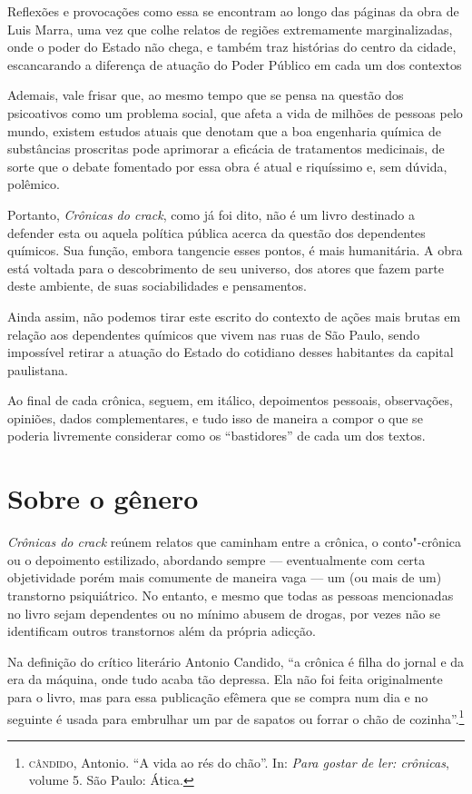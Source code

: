 Reflexões e provocações como essa se encontram ao longo das páginas da
obra de Luis Marra, uma vez que colhe relatos de regiões extremamente
marginalizadas, onde o poder do Estado não chega, e também traz
histórias do centro da cidade, escancarando a diferença de atuação do
Poder Público em cada um dos contextos

Ademais, vale frisar que, ao mesmo tempo que se pensa na questão dos
psicoativos como um problema social, que afeta a vida de milhões de
pessoas pelo mundo, existem estudos atuais que denotam que a boa
engenharia química de substâncias proscritas pode aprimorar a eficácia
de tratamentos medicinais, de sorte que o debate fomentado por essa obra
é atual e riquíssimo e, sem dúvida, polêmico.

Portanto, \textit{Crônicas do crack}, como já foi dito, não é um livro destinado
a defender esta ou aquela política pública acerca da questão dos
dependentes químicos. Sua função, embora tangencie esses pontos, é mais
humanitária. A obra está voltada para o descobrimento de seu universo,
dos atores que fazem parte deste ambiente, de suas sociabilidades e
pensamentos.

Ainda assim, não podemos tirar este escrito do contexto de ações mais
brutas em relação aos dependentes químicos que vivem nas ruas de São
Paulo, sendo impossível retirar a atuação do Estado do cotidiano desses
habitantes da capital paulistana.

Ao final de cada crônica, seguem, em itálico, depoimentos pessoais,
observações, opiniões, dados complementares, e tudo isso de maneira a compor o
que se poderia livremente considerar como os “bastidores” de cada um dos
textos.

\pagebreak
\section{Sobre o gênero}

\textit{Crônicas do crack} reúnem relatos que caminham entre a crônica, o conto"-crônica ou o depoimento estilizado, abordando sempre --- eventualmente com certa objetividade porém mais
comumente de maneira vaga --- um (ou mais de um) transtorno psiquiátrico.
No entanto, e mesmo que todas as pessoas mencionadas no livro sejam dependentes
ou no mínimo abusem de drogas, por vezes não se identificam outros transtornos
além da própria adicção.

Na definição do crítico literário Antonio Candido, ``a crônica é filha do jornal e da era da máquina, onde tudo acaba tão depressa. Ela não foi feita originalmente para o livro, mas para essa publicação efêmera que se compra num dia e no seguinte é usada para embrulhar um par de sapatos ou forrar o chão de cozinha''.\footnote{\textsc{cândido}, Antonio. ``A vida ao rés do chão''. In: \textit{Para gostar de ler: crônicas}, volume 5. São Paulo: Ática.}

